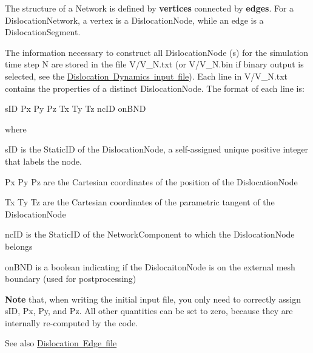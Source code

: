 The structure of a Network is defined by {\bfseries{vertices}} connected by {\bfseries{edges}}. For a Dislocation\+Network, a vertex is a Dislocation\+Node, while an edge is a Dislocation\+Segment.

The information necessary to construct all Dislocation\+Node (s) for the simulation time step N are stored in the file V/\+V\+\_\+\+N.\+txt (or V/\+V\+\_\+\+N.\+bin if binary output is selected, see the \mbox{\hyperlink{_d_d_input}{Dislocation Dynamics input file}}). Each line in V/\+V\+\_\+\+N.\+txt contains the properties of a distinct Dislocation\+Node. The format of each line is\+: \begin{DoxyVerb}sID Px Py Pz Tx Ty Tz ncID onBND
\end{DoxyVerb}
 where
\begin{DoxyItemize}
\item s\+ID is the Static\+ID of the Dislocation\+Node, a self-\/assigned unique positive integer that labels the node.
\item Px Py Pz are the Cartesian coordinates of the position of the Dislocation\+Node
\item Tx Ty Tz are the Cartesian coordinates of the parametric tangent of the Dislocation\+Node
\item nc\+ID is the Static\+ID of the Network\+Component to which the Dislocation\+Node belongs
\item on\+B\+ND is a boolean indicating if the Dislocaiton\+Node is on the external mesh boundary (used for postprocessing)
\end{DoxyItemize}

{\bfseries{Note}} that, when writing the initial input file, you only need to correctly assign s\+ID, Px, Py, and Pz. All other quantities can be set to zero, because they are internally re-\/computed by the code.

\begin{DoxySeeAlso}{See also}
\mbox{\hyperlink{_d_d_edge}{Dislocation Edge file}} 
\end{DoxySeeAlso}
